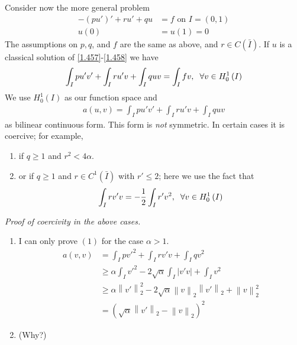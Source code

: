 \documentclass[a4paper,oneside]{book}
\numberwithin{equation}{chapter}
\begin{document}
Consider now the more general problem
\begin{align}
\label{1.457}
 - \left( {pu'} \right)' + ru' + qu &= f\mbox{ on } I = \left( {0,1} \right)\\
u\left( 0 \right) &= u\left( 1 \right) = 0 \label{1.458}
\end{align}
The assumptions on $p,q$, and $f$ are the same as above, and $r\in C\left(\bar I\right)$. If $u$ is a classical solution of \eqref{1.457}-\eqref{1.458} we have
\begin{align}
\int_I {pu'v'}  + \int_I {ru'v}  + \int_I {quv}  = \int_I {fv} ,\hspace{0.2cm}\forall v \in H_0^1\left( I \right)
\end{align}
We use $H_0^1\left(I\right)$ as our function space and 
\begin{align}
a\left( {u,v} \right) = \int_I {pu'v'}  + \int_I {ru'v}  + \int_I {quv} 
\end{align}
as bilinear continuous form. This form is \textit{not} symmetric. In certain cases it is coercive; for example,
\begin{enumerate}
\item if $q\ge 1$ and $r^2<4\alpha$.
\item or if $q\ge 1$ and $r\in C^1\left(\bar I\right)$ with $r'\le 2$; here we use the fact that
\begin{align}
\label{1.461}
\int_I {rv'v}  =  - \frac{1}{2}\int_I {r'{v^2}} ,\hspace{0.2cm}\forall v \in H_0^1\left( I \right)
\end{align}
\end{enumerate}
\textit{Proof of coercivity in the above cases.} 
\begin{enumerate}
\item I can only prove $\left(1\right)$ for the case $\alpha >1$.
\begin{align}
a\left( {v,v} \right) &= \int_I {pv{'^2}}  + \int_I {rv'v}  + \int_I {q{v^2}} \\
& \ge \alpha \int_I {v{'^2}}  - 2\sqrt \alpha  \int_I {\left| {v'v} \right|}  + \int_I {{v^2}} \\
 &\ge \alpha \left\| {v'} \right\|_2^2 - 2\sqrt \alpha  {\left\| v \right\|_2}{\left\| {v'} \right\|_2} + \left\| v \right\|_2^2\\
& = {\left( {\sqrt \alpha  {{\left\| {v'} \right\|}_2} - {{\left\| v \right\|}_2}} \right)^2}
\end{align}
\item  (Why?)
\end{enumerate}
\end{document}

